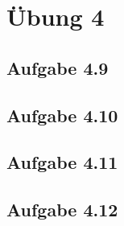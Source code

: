 \documentclass{standalone}
\begin{document}
 
\section{Übung 4}

\subsection{Aufgabe 4.9}

\subsection{Aufgabe 4.10}

\subsection{Aufgabe 4.11}

\subsection{Aufgabe 4.12}
\end{document}
